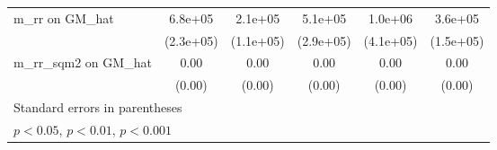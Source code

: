 {\begin{tabular}{l*{5}{c}}
\addlinespace
m\_rr on GM\_hat  &  6.8e+05\sym{**} &  2.1e+05         &  5.1e+05         &  1.0e+06\sym{*}  &  3.6e+05\sym{*}  \\
                &(2.3e+05)         &(1.1e+05)         &(2.9e+05)         &(4.1e+05)         &(1.5e+05)         \\
\addlinespace
m\_rr\_sqm2 on GM\_hat&     0.00         &     0.00\sym{*}  &     0.00\sym{**} &     0.00         &     0.00\sym{**} \\
                &   (0.00)         &   (0.00)         &   (0.00)         &   (0.00)         &   (0.00)         \\
\bottomrule
\multicolumn{6}{l}{\footnotesize Standard errors in parentheses}\\
\multicolumn{6}{l}{\footnotesize \sym{*} \(p<0.05\), \sym{**} \(p<0.01\), \sym{***} \(p<0.001\)}\\
\end{tabular}
}
